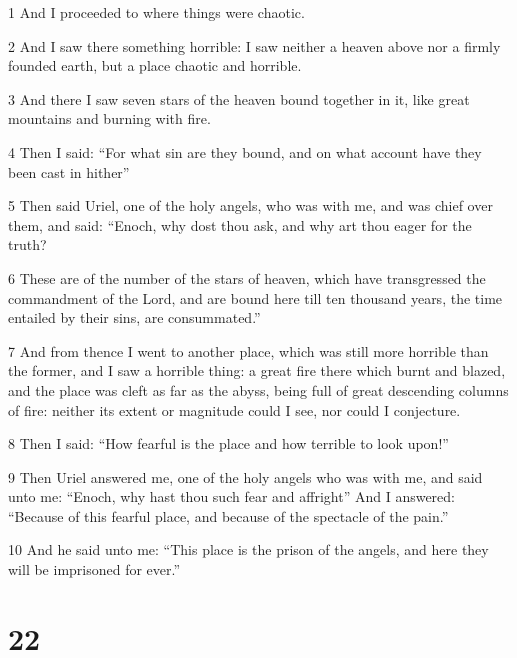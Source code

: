 \par 1 And I proceeded to where things were chaotic.
\par 2 And I saw there something horrible: I saw neither a heaven above nor a firmly founded earth, but a place chaotic and horrible.
\par 3 And there I saw seven stars of the heaven bound together in it, like great mountains and burning with fire.
\par 4 Then I said: “For what sin are they bound, and on what account have they been cast in hither”
\par 5 Then said Uriel, one of the holy angels, who was with me, and was chief over them, and said: “Enoch, why dost thou ask, and why art thou eager for the truth?
\par 6 These are of the number of the stars of heaven, which have transgressed the commandment of the Lord, and are bound here till ten thousand years, the time entailed by their sins, are consummated.”
\par 7 And from thence I went to another place, which was still more horrible than the former, and I saw a horrible thing: a great fire there which burnt and blazed, and the place was cleft as far as the abyss, being full of great descending columns of fire: neither its extent or magnitude could I see, nor could I conjecture.
\par 8 Then I said: “How fearful is the place and how terrible to look upon!”
\par 9 Then Uriel answered me, one of the holy angels who was with me, and said unto me: “Enoch, why hast thou such fear and affright” And I answered: “Because of this fearful place, and because of the spectacle of the pain.”
\par 10 And he said unto me: “This place is the prison of the angels, and here they will be imprisoned for ever.”

\chapter{22}

